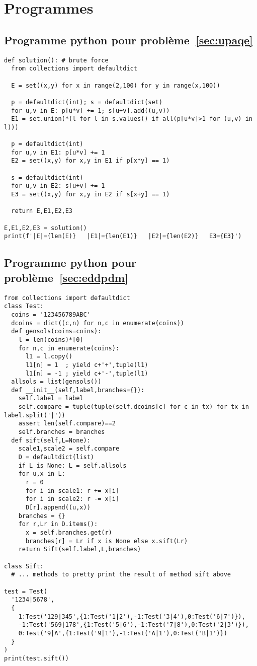 \documentclass{article}
\begin{document}
\section{Programmes}
\subsection{Programme python pour problème~\ref{sec:upaqe}}
\label{anx:upaqe}
\begin{verbatim}
def solution(): # brute force
  from collections import defaultdict

  E = set((x,y) for x in range(2,100) for y in range(x,100))

  p = defaultdict(int); s = defaultdict(set)
  for u,v in E: p[u*v] += 1; s[u+v].add((u,v))
  E1 = set.union(*(l for l in s.values() if all(p[u*v]>1 for (u,v) in l)))

  p = defaultdict(int)
  for u,v in E1: p[u*v] += 1
  E2 = set((x,y) for x,y in E1 if p[x*y] == 1)

  s = defaultdict(int)
  for u,v in E2: s[u+v] += 1
  E3 = set((x,y) for x,y in E2 if s[x+y] == 1)

  return E,E1,E2,E3

E,E1,E2,E3 = solution()
print(f'|E|={len(E)}   |E1|={len(E1)}   |E2|={len(E2)}   E3={E3}')
\end{verbatim}
\newpage
\subsection{Programme python pour problème~\ref{sec:eddpdm}}
\label{anx:eddpdm}
\begin{verbatim}
from collections import defaultdict
class Test:
  coins = '123456789ABC'
  dcoins = dict((c,n) for n,c in enumerate(coins))
  def gensols(coins=coins):
    l = len(coins)*[0]
    for n,c in enumerate(coins):
      l1 = l.copy()
      l1[n] = 1  ; yield c+'+',tuple(l1)
      l1[n] = -1 ; yield c+'-',tuple(l1)
  allsols = list(gensols())
  def __init__(self,label,branches={}):
    self.label = label
    self.compare = tuple(tuple(self.dcoins[c] for c in tx) for tx in label.split('|'))
    assert len(self.compare)==2
    self.branches = branches
  def sift(self,L=None):
    scale1,scale2 = self.compare
    D = defaultdict(list)
    if L is None: L = self.allsols
    for u,x in L:
      r = 0
      for i in scale1: r += x[i]
      for i in scale2: r -= x[i]
      D[r].append((u,x))
    branches = {}
    for r,Lr in D.items():
      x = self.branches.get(r)
      branches[r] = Lr if x is None else x.sift(Lr)
    return Sift(self.label,L,branches)

class Sift:
  # ... methods to pretty print the result of method sift above

test = Test(
  '1234|5678',
  {
    1:Test('129|345',{1:Test('1|2'),-1:Test('3|4'),0:Test('6|7')}),
    -1:Test('569|178',{1:Test('5|6'),-1:Test('7|8'),0:Test('2|3')}),
    0:Test('9|A',{1:Test('9|1'),-1:Test('A|1'),0:Test('B|1')})
  }
)
print(test.sift())
\end{verbatim}
\end{document}
